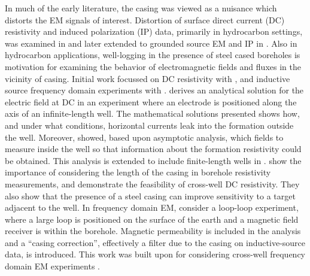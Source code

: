 \documentclass[preprint,review,3p,times,onecolumn,authoryear]{elsarticle}
\begin{document}
In much of the early literature, the casing was viewed as a nuisance which distorts the EM signals of interest. Distortion of surface direct current (DC) resistivity and induced polarization (IP) data, primarily in hydrocarbon settings, was examined in \citep{Wait1983, Holladay1984, Johnston1987} and later extended to grounded source EM and IP in \citep{Wait1985, Williams1985, Johnston1992}. Also in hydrocarbon applications, well-logging in the presence of steel cased boreholes is motivation for examining the behavior of electromagnetic fields and fluxes in the vicinity of casing. Initial work focussed on DC resistivity with \citep{Kaufman1990, Schenkel1990, Kaufman1993, Schenkel1994}, and inductive source frequency domain experiments with \citep{Augustin1989}. \cite{Kaufman1990} derives an analytical solution for the electric field at DC in an experiment where an electrode is positioned along the axis of an infinite-length well. The mathematical solutions presented shows how, and under what conditions, horizontal currents leak into the formation outside the well. Moreover, \cite{Kaufman1990} showed, based upon asymptotic analysis, which fields to measure inside the well so that information about the formation resistivity could be obtained. This analysis is extended to include finite-length wells in \cite{Kaufman1993}. \cite{Schenkel1994} show the importance of considering the length of the casing in borehole resistivity measurements, and demonstrate the feasibility of cross-well DC resistivity. They also show that the presence of a steel casing can improve sensitivity to a target adjacent to the well. In frequency domain EM, \cite{Augustin1989} consider a loop-loop experiment, where a large loop is positioned on the surface of the earth and a magnetic field receiver is within the borehole. Magnetic permeability is included in the analysis and a ``casing correction'', effectively a filter due to the casing on inductive-source data, is introduced. This work was built upon for considering cross-well frequency domain EM experiments \citep{Uchida1991, Wilt1996}.
\end{document}
